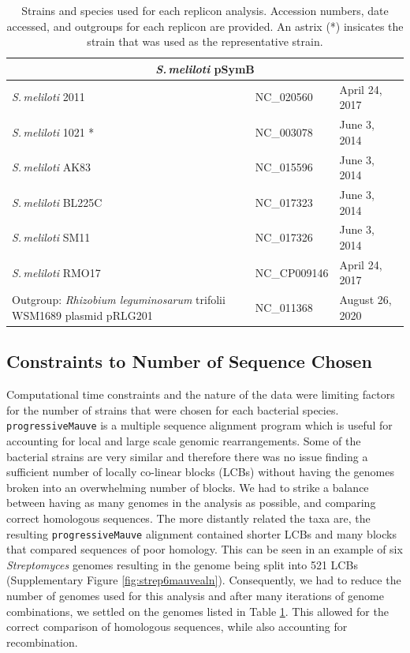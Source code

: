 \documentclass[11pt]{article}
\newcommand{\smel}{\textit{S.\,meliloti}\xspace}
\newcommand{\agrot}{\textit{Agrobacterium tumefaciens}\xspace}
\newcommand{\strep}{\textit{Streptomyces}\xspace}
\newcommand{\p}{\texttt{progressiveMauve}\xspace}
\newcommand{\rleg}{\textit{Rhizobium leguminosarum}\xspace}
\begin{document}
\begin{table}[H]
{\begin{minipage}{\textwidth}
\begin{tabular}{lll}
				\midrule
				\multicolumn{3}{c}{\smel pSymB} \\
				\midrule
				\smel 2011 & NC\_020560 & April 24, 2017\\
				\smel 1021 * & NC\_003078 & June 3, 2014\\
				\smel AK83 & NC\_015596 & June 3, 2014\\
				\smel BL225C & NC\_017323 & June 3, 2014\\
				\smel SM11 & NC\_017326 & June 3, 2014\\
				\smel RMO17 & NC\_CP009146 & April 24, 2017\\
				Outgroup: \rleg trifolii WSM1689 plasmid pRLG201 & NC\_011368 & August 26, 2020\\
		
				\bottomrule
				
				
			\end{tabular}
			\caption{\label{tab:seqdata} Strains and species used for each replicon analysis. Accession numbers, date accessed, and outgroups for each replicon are provided. An astrix (*) insicates the strain that was used as the representative strain.}
		\end{minipage}}
	\end{table}	

\subsection{Constraints to Number of Sequence Chosen}
Computational time constraints and the nature of the data were limiting factors for the number of strains that were chosen for each bacterial species.
\p is a multiple sequence alignment program which is useful for accounting for local and large scale genomic rearrangements. 
Some of the bacterial strains are very similar and therefore there was no issue finding a sufficient number of locally co-linear blocks (LCBs) without having the genomes broken into an overwhelming number of blocks.
We had to strike a balance between having as many genomes in the analysis as possible, and comparing correct homologous sequences.
The more distantly related the taxa are, the resulting \p alignment contained shorter LCBs and many blocks that compared sequences of poor homology.
This can be seen in an example of six \strep genomes resulting in the genome being split into 521 LCBs (Supplementary Figure \ref{fig:strep6mauvealn}).
Consequently, we had to reduce the number of genomes used for this analysis and after many iterations of genome combinations, we settled on the genomes listed in Table \ref{tab:seqdata}.
This allowed for the correct comparison of homologous sequences, while also accounting for recombination.
\end{document}
